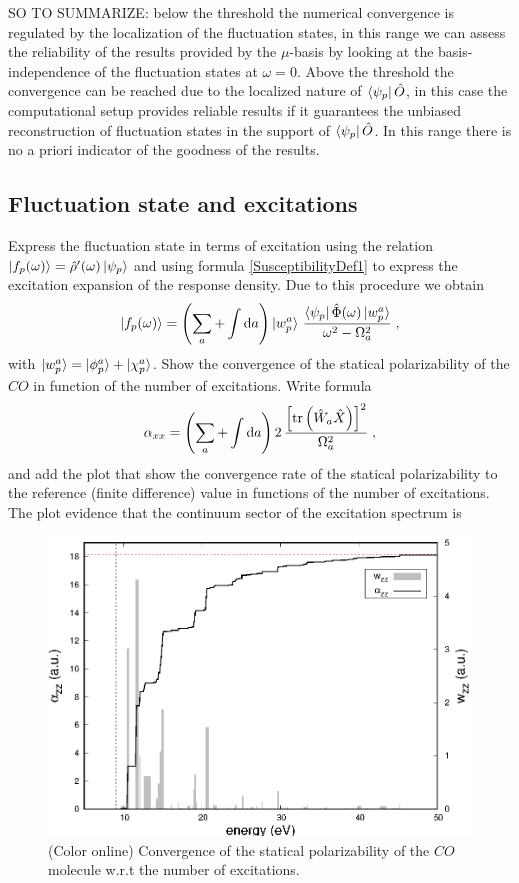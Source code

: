 \documentclass[reprint,aps,prb]{revtex4-1}
\newcommand{\dd}{{\rm d}}
\newcommand{\be}{\begin{equation}}
\newcommand{\ee}{\end{equation}}
\newcommand{\lb}{\label}
\newcommand{\op}[1]{\hat {#1}}
\newcommand{\trace}[1]{\mathrm{tr}\left(#1\right)}
\newcommand{\dm}{\op{\rho}}
\begin{document}
SO TO SUMMARIZE: below the threshold the numerical convergence is regulated by the localization of the fluctuation states, in this range we can assess the reliability of the results provided by
the $\mu$-basis by looking at the basis-independence of the fluctuation states at $\omega=0$. Above the threshold the convergence can be reached due to the localized nature of $\bra{\psi_p}\op O$, 
in this case the computational setup provides reliable results if it guarantees the unbiased reconstruction of fluctuation states in the support of $\bra{\psi_p}\op O$. In this range there is no a 
priori indicator of the goodness of the results. 


\subsection{Fluctuation state and excitations}

Express the fluctuation state in terms of excitation using the relation $\ket{f_p(\omega)} = \dm'(\omega)\ket{\psi_p}$ and using formula \eqref{SusceptibilityDef1} to express the excitation
expansion of the response density. Due to this procedure we obtain
\be\lb{FSExcitationDef1}
\ket{f_p(\omega)}   = \left(\sum_a + \int\dd a   \right) \ket{w_p^a} \,
\frac{\bra{\psi_p}\op\Phi(\omega)\ket{w_p^a}}{\omega^2-\Omega_a^2} \;,
\ee 
with $\ket{w_p^a}=\ket{\phi_p^a}+\ket{\chi_p^a}$. 
Show the convergence of the statical polarizability of the $CO$ in function of the number of excitations. Write formula
\be\lb{AlphaExcitationDef1}
\alpha_{xx} =  \left(\sum_a + \int\dd a   \right) 2 \,
\frac{\left[\trace{\op W_a \op X}\right]^2}{\Omega_a^2} \;,
\ee 
and add the plot that show the convergence rate of the statical polarizability to the reference (finite difference) value in functions of the number of excitations. The plot evidence that the
continuum sector of the excitation spectrum is 
\begin{figure}
\includegraphics[scale=0.6]{CO_statPolvsExc.eps}
\caption{\label{co_AlphaExc}(Color online) Convergence of the statical polarizability of the $CO$ molecule w.r.t the number of excitations.}
\end{figure}
\end{document}
